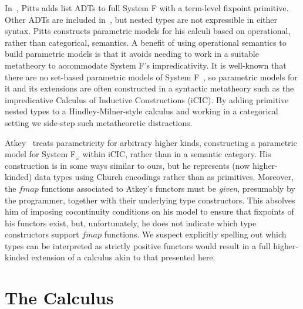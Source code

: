 \documentclass{lmcs}
\theoremstyle{plain}\newtheorem{satz}[thm]{Satz}
\begin{document}
{In~\cite{pit00}, Pitts adds list ADTs to full System F with a
term-level fixpoint primitive. Other ADTs are included
in~\cite{pit98}, but nested types are not expressible in either
syntax. Pitts constructs parametric models for his calculi based on
operational, rather than categorical, semantics. A benefit of using
operational semantics to build parametric models is that it avoids
needing to work in a suitable metatheory to accommodate System F's
impredicativity. It is well-known that there are no set-based
parametric models of System F~\cite{rey84}, so parametric models for
it and its extensions are often constructed in a syntactic metatheory
such as the impredicative Calculus of Inductive Constructions (iCIC).
By adding primitive nested types to a Hindley-Milner-style calculus
and working in a categorical setting we side-step such metatheoretic
distractions.

Atkey~\cite{atk12} treats parametricity for arbitrary higher kinds,
constructing a parametric model for System F$_\omega$ within iCIC,
rather than in a semantic category. His construction is in some ways
similar to ours, but he represents (now higher-kinded) data types
using Church encodings rather than as primitives. Moreover, the
$\mathit{fmap}$ functions associated to Atkey's functors must be {\em
  given}, presumably by the programmer, together with their underlying
type constructors. This absolves him of imposing cocontinuity
conditions on his model to ensure that fixpoints of his functors
exist, but, unfortunately, he does not indicate which type
constructors support $\mathit{fmap}$ functions. We suspect explicitly
spelling out which types can be interpreted as strictly positive
functors would result in a full higher-kinded extension of a calculus
akin to that presented here.

\section{The Calculus}\label{sec:calculus}

}
\end{document}

